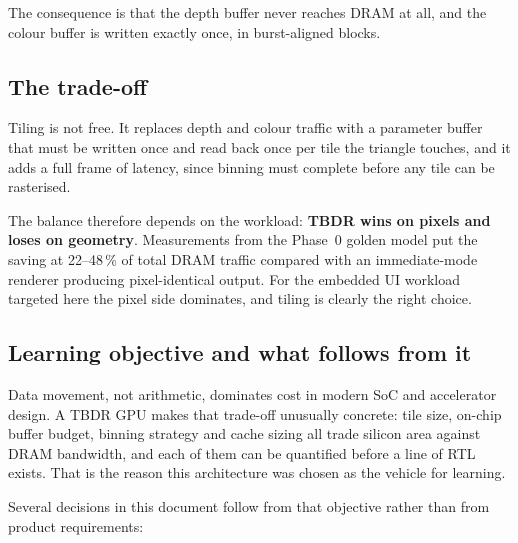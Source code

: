 \documentclass[11pt,a4paper]{article}
\begin{document}
The consequence is that the depth buffer never reaches DRAM at all, and the
colour buffer is written exactly once, in burst-aligned blocks.

\subsection{The trade-off}

Tiling is not free. It replaces depth and colour traffic with a parameter buffer
that must be written once and read back once per tile the triangle touches, and
it adds a full frame of latency, since binning must complete before any tile can
be rasterised.

The balance therefore depends on the workload: \textbf{TBDR wins on pixels and
loses on geometry}. Measurements from the Phase~0 golden model put the saving at
22--48\,\% of total DRAM traffic compared with an immediate-mode renderer
producing pixel-identical output. For the embedded UI workload targeted here the
pixel side dominates, and tiling is clearly the right choice.

\subsection{Learning objective and what follows from it}

Data movement, not arithmetic, dominates cost in modern SoC and accelerator
design. A TBDR GPU makes that trade-off unusually concrete: tile size, on-chip
buffer budget, binning strategy and cache sizing all trade silicon area against
DRAM bandwidth, and each of them can be quantified before a line of RTL exists.
That is the reason this architecture was chosen as the vehicle for learning.

Several decisions in this document follow from that objective rather than from
product requirements:
\end{document}
